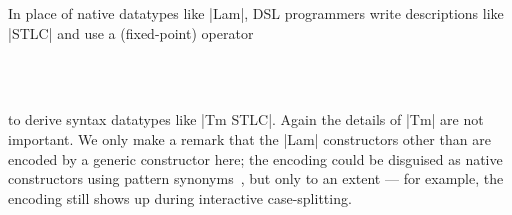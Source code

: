 \documentclass[sigplan,review,fleqn]{acmart}
\renewcommand{\verb}{\collectverb{\color{AgdaFunction}}}
\begin{document}
In place of native datatypes like \verb|Lam|, DSL programmers write descriptions like \verb|STLC| and use a (fixed-point) operator 
\begin{code}
	\>[0]\AgdaSpace{}%
	\AgdaSpace{}%
	\AgdaSymbol{(}\AgdaSpace{}%
	\AgdaSymbol{:}\AgdaSpace{}%
	\AgdaSpace{}%
	\AgdaSymbol{)}\AgdaSpace{}%
	\AgdaSymbol{:}\AgdaSpace{}%
	\AgdaSpace{}%
	\AgdaSpace{}%
	\AgdaSpace{}%
	\AgdaSpace{}%
	\AgdaSpace{}%
	\AgdaSpace{}%
	\<%
	\\
	\>[0][@{}l@{\AgdaIndent{0}}]%
	\>[2]\AgdaSpace{}%
	\>[3]\AgdaSymbol{:}\AgdaSpace{}%
	\AgdaSpace{}%
	\AgdaSpace{}%
	\AgdaSpace{}%
	\AgdaSpace{}%
	\AgdaSpace{}%
	\AgdaSpace{}%
	\AgdaSpace{}%
	\<%
	\\
	\>[2]\AgdaSpace{}%
	\>[3]\AgdaSymbol{:}\AgdaSpace{}%
	\AgdaSpace{}%
	\AgdaSpace{}%
	\AgdaSpace{}%
	\AgdaSymbol{(}\AgdaSpace{}%
	\AgdaSymbol{(}\AgdaSpace{}%
	\AgdaSpace{}%
	\AgdaSymbol{))}\AgdaSpace{}%
	\AgdaSpace{}%
	\AgdaSpace{}%
	\AgdaSpace{}%
	\AgdaSpace{}%
	\AgdaSpace{}%
	\AgdaSpace{}%
	\<%
\end{code}
to derive syntax datatypes like \verb|Tm STLC|.
Again the details of \verb|Tm| are not important.
We only make a remark that the \verb|Lam| constructors other than  are encoded by a generic constructor  here; the encoding could be disguised as native constructors using pattern synonyms~\citep{Pickering-pattern-synonyms}, but only to an extent --- for example, the encoding still shows up during interactive case-splitting.
\end{document}
